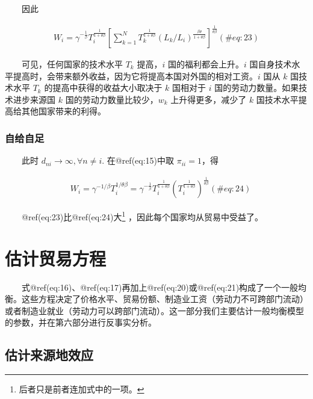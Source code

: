 \documentclass[]{tufte-handout}
\begin{document}
　　因此

\begin{align}
W_{i}=\gamma^{-\frac{1}{\beta}} T_{i}^{\frac{1}{1+\theta \beta}}\left[\sum_{k=1}^{N} T_{k}^{\frac{1}{1+\theta \beta}}\left(L_{k} / L_{i}\right)^{\frac{\beta \theta}{1+\theta \beta}}\right]^{\frac{1}{\theta \beta}} (\#eq:23)
\end{align}

　　可见，任何国家的技术水平 \(T_k\) 提高，\(i\) 国的福利都会上升。\(i\)
国自身技术水平提高时，会带来额外收益，因为它将提高本国对外国的相对工资。\(i\)
国从 \(k\) 国技术水平 \(T_k\) 的提高中获得的收益大小取决于 \(k\)
国相对于 \(i\) 国的劳动力数量。如果技术进步来源国 \(k\)
国的劳动力数量比较少，\(w_k\) 上升得更多，减少了 \(k\)
国技术水平提高给其他国家带来的利得。

\hypertarget{ux81eaux7ed9ux81eaux8db3}{%
\subsubsection{自给自足}\label{ux81eaux7ed9ux81eaux8db3}}

　　此时 \(d_{n i} \rightarrow \infty, \forall n \neq i\).
在@ref(eq:15)中取 \(\pi_{ii}=1\)，得

\begin{align}
\quad W_{i}=\gamma^{-1 / \beta} T_{i}^{1 / \theta \beta}=\gamma^{-\frac{1}{\beta}} T_{i}^{\frac{1}{1+\theta \beta}}\left(T_{i}^{\frac{1}{1+\theta \beta}}\right)^{\frac{1}{\theta \beta}} (\#eq:24)
\end{align}

　　@ref(eq:23)比@ref(eq:24)大\footnote{后者只是前者连加式中的一项。}
，因此每个国家均从贸易中受益了。

\hypertarget{ux4f30ux8ba1ux8d38ux6613ux65b9ux7a0b}{%
\section{估计贸易方程}\label{ux4f30ux8ba1ux8d38ux6613ux65b9ux7a0b}}

　　式@ref(eq:16)、@ref(eq:17)再加上@ref(eq:20)或@ref(eq:21)构成了一个一般均衡。这些方程决定了价格水平、贸易份额、制造业工资（劳动力不可跨部门流动）或者制造业就业（劳动力可以跨部门流动）。这一部分我们主要估计一般均衡模型的参数，并在第六部分进行反事实分析。

\hypertarget{ux4f30ux8ba1ux6765ux6e90ux5730ux6548ux5e94}{%
\subsection{估计来源地效应}\label{ux4f30ux8ba1ux6765ux6e90ux5730ux6548ux5e94}}
\end{document}
